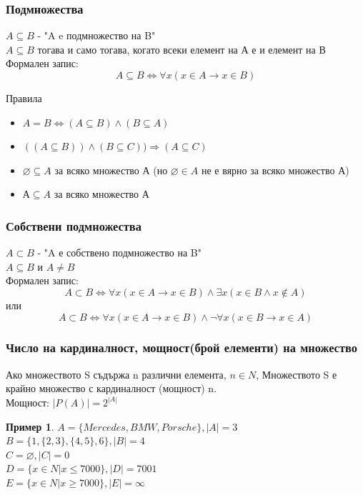 \documentclass[fleqn, 12pt]{article}
\theoremstyle{definition}
\newtheorem{example}{Пример}[subsection]
\begin{document}
\subsubsection{Подмножества}
$A \subseteq B$ - "A e подмножество на B"\\
$A \subseteq B$ тогава и само тогава, когато всеки елемент на А е и елемент на В\\
Формален запис:
$$A \subseteq B \Leftrightarrow \forall x (x \in A \to x \in B )$$

\newpage
Правила
\begin{itemize}
	\item $A = B \Leftrightarrow (A \subseteq B) \land (B \subseteq A)$
	\item $((A \subseteq B)) \land (B \subseteq C)) \Rightarrow (A \subseteq C) $
	\item $\varnothing \subseteq A$ за всяко множество А (но $\varnothing \in A$ не е вярно за всяко множество А)
	\item $А \subseteq A$ за всяко множество А
\end{itemize}

\subsubsection{Собствени подмножества}
$A \subset B$ - "A е собствено подмножество на B"\\
$A \subseteq B$ и $A \neq B$\\
Формален запис:
$$A \subset B \Leftrightarrow \forall x (x \in A \to x \in B ) \land \exists x (x \in B \land x \notin A)$$
или
$$A \subset B \Leftrightarrow \forall x (x \in A \to x \in B ) \land \neg \forall x (x \in B \to x \in A)$$

\subsubsection{Число на кардиналност, мощност(брой елементи)  на множество}
Ако множеството S съдържа n различни елемента, $n \in N$, Множеството S е крайно множество с кардиналност (мощност) n.\\
Мощност: $|P(A)| = 2^{|A|}$ 
\begin{example}
$A = \{Mercedes, BMW, Porsche\}, |A| = 3 $\\
$B = \{1, \{2, 3\}, \{4, 5\}, 6\}, |B| = 4 $\\
$C = \varnothing, |C| = 0 $ \\
$D = \{x \in N | x \leq 7000\}, |D| = 7001$\\
$E = \{x \in N | x \geq 7000\}, |E| = \infty$\\
\end{example}
\end{document}
